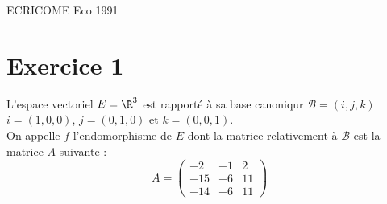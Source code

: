 \documentclass[11pt]{article}%
\begin{document}
\begin{center}
{\Huge ECRICOME Eco 1991}
\end{center}

\section*{\textbf{Exercice 1}}

L'espace vectoriel $E = \R^{3}$ est rapporté à sa base canoniqur
$\mathcal{B} = (i,j,k)$ $i = (1,0,0)$, $j = (0,1,0)$ et $k = (0,0,1)$.
\\
On appelle $f$ l'endomorphisme de $E$ dont la matrice relativement à
$\mathcal{B}$ est la matrice $A$ suivante : 
\[
A = \left( 
\begin{array}{rrr}
-2 & -1 & 2 \\
-15 & -6 & 11 \\
-14 & -6 & 11
\end{array}
\right) 
\]
\end{document}
